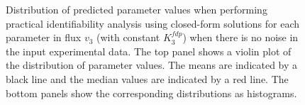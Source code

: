 \documentclass[10pt]{article}
\begin{document}
\begin{figure}[!tbhp]
	\caption{Distribution of predicted parameter values when performing practical identifiability analysis using closed-form solutions for each parameter in flux $v_3$ (with constant $K_3^{fdp}$) when there is no noise in the input experimental data. The top panel shows a violin plot of the distribution of parameter values. The means are indicated by a black line and the median values are indicated by a red line. The bottom panels show the corresponding distributions as histograms.}\label{fig:v3_var_k3pep_values}
\end{figure}	

\begin{figure}[!tbhp]
	\caption{}\label{fig:v3_var_1_2_ck_ident}
\end{figure}
\end{document}
